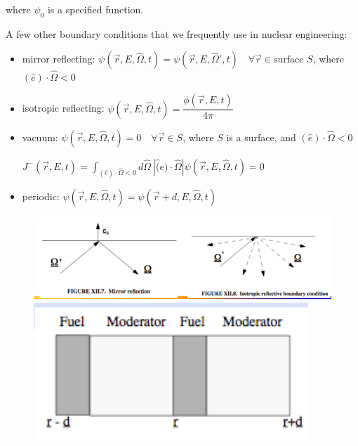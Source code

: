 \documentclass[12pt]{article}
\newcommand{\vOmega}{\ensuremath{\hat{\Omega}}}
\begin{document}
where $\psi_0$ is a specified function.

A few other boundary conditions that we frequently use in nuclear engineering:

\begin{itemize}
\item mirror reflecting:
      $\psi(\vec{r}, E, \vOmega, t) =
      \psi(\vec{r}, E, \vOmega', t) \quad \forall \vec{r} \in \text{surface }
      S$, where $(\hat{e})\cdot \vOmega < 0$
\item isotropic reflecting:
      $\psi(\vec{r}, E, \vOmega, t) =  \dfrac{\phi(\vec{r}, E, t)}{4\pi}$
\item vacuum: $\psi(\vec{r}, E, \vOmega, t) = 0\quad \forall \vec{r} \in S$,
      where $S$ is a surface, and $(\hat{e})\cdot \vOmega < 0$

$J^-(\vec{r}, E, t) = \int_{(\hat{e})\cdot \vOmega < 0} d\vOmega \:
|\hat(e)\cdot \vOmega| \psi(\vec{r}, E, \vOmega, t) = 0$

\item periodic:
      $\psi(\vec{r}, E, \vOmega, t) = \psi(\vec{r} + d, E, \vOmega, t)$
\end{itemize}

\begin{figure}[h!]
    \begin{center}
    \includegraphics[keepaspectratio, width = 3.5 in]{reflecting-bc}
     \includegraphics[keepaspectratio, width = 2 in]{periodic-bc}
    \end{center}
\end{figure}
\end{document}
